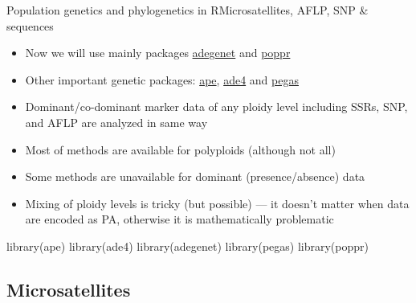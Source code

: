 \documentclass[compress, ucs, xelatex, 11pt, xcolor=svgnames,
  hyperref={
    bookmarks=true,
    unicode=true,
    colorlinks=true,
    pdftitle={Molecular data in R},
    plainpages=false,
    pdfauthor={Vojtech Zeisek},
    pdfsubject={Course about phylogeny and evolution in R},
    pdfcreator={XeLaTeX},
    pdfkeywords={R, evolution, phylogeny, molecular data},
    linkcolor=Tomato,
    anchorcolor=SaddleBrown,
    citecolor=Goldenrod,
    filecolor=DarkMagenta,
    menucolor=Sienna,
    urlcolor=DarkTurquoise,
    pdftex},
  url={hyphens, lowtilde} %
  ]{beamer}
\begin{document}
\begin{frame}[fragile]{Population genetics and phylogenetics in R}{Microsatellites, AFLP, SNP \& sequences}
  \begin{multicols}{2}
    \begin{itemize}
      \item Now we will use mainly packages \href{http://adegenet.r-forge.r-project.org/}{adegenet} and \href{http://grunwaldlab.cgrb.oregonstate.edu/poppr-r-package-population-genetics}{poppr}
      \item Other important genetic packages: \href{http://ape-package.ird.fr/}{ape}, \href{http://pbil.univ-lyon1.fr/ADE-4/}{ade4} and \href{http://ape-package.ird.fr/pegas.html}{pegas}
      \item Dominant/co-dominant marker data of any ploidy level including SSRs, SNP, and AFLP are analyzed in same way
      \item Most of methods are available for polyploids (although not all)
      \item Some methods are unavailable for dominant (presence/absence) data
      \item Mixing of ploidy levels is tricky (but possible) --- it doesn't matter when data are encoded as PA, otherwise it is mathematically problematic
    \end{itemize}
    \begin{spluscode}
      library(ape)
      library(ade4)
      library(adegenet)
      library(pegas)
      library(poppr)
    \end{spluscode}
  \end{multicols}
\end{frame}

\subsection{Microsatellites}
\end{document}
